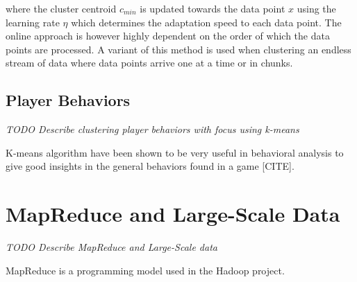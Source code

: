 where the cluster centroid $c_{min}$ is updated towards the data point $x$ using the learning rate $\eta$ which determines the adaptation speed to each data point. The online approach is however highly dependent on the order of which the data points are processed. A variant of this method is used when clustering an endless stream of data where data points arrive one at a time or in chunks.


\subsection{Player Behaviors}
\textit{TODO Describe clustering player behaviors with focus using k-means}

K-means algorithm have been shown to be very useful in behavioral analysis to give good insights in the general behaviors found in a game [CITE].

\lipsum[6]


\section{MapReduce and Large-Scale Data}
\textit{TODO Describe MapReduce and Large-Scale data}

MapReduce is a programming model used in the Hadoop project.


\lipsum[7-9]


